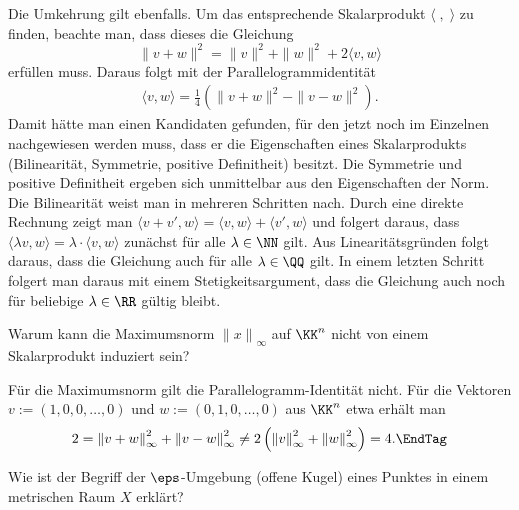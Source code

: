 \begin{antwort}
  Die Umkehrung gilt ebenfalls. 
  Um das entsprechende Skalarprodukt 
  $\langle \;, \; \rangle$ zu finden, beachte man, 
  dass dieses die Gleichung 
  \[
  \| v+ w \|^2 = \| v \|^2 + \|w \|^2 + 2\langle v,w \rangle 
  \]
  erfüllen muss. Daraus folgt mit der Parallelogrammidentität
  \begin{eqnarray*}
    \langle v, w \rangle = \frac{1}{4} 
    \left( \| v+w \|^2 - \| v-w \|^2 \right).
  \end{eqnarray*}
  Damit hätte man einen Kandidaten gefunden, für den jetzt 
  noch im Einzelnen nachgewiesen werden muss, dass er die Eigenschaften 
  eines Skalarprodukts (Bilinearität, Symmetrie, positive Definitheit) 
  besitzt. Die Symmetrie und positive Definitheit ergeben sich unmittelbar 
  aus den Eigenschaften der Norm. 
  Die Bilinearität weist man in mehreren Schritten nach. 
  Durch eine direkte Rechnung zeigt man 
  $\langle v+v', w \rangle = \langle v, w \rangle + \langle v', w \rangle$ und 
  folgert daraus, dass  $\langle \lambda v, w \rangle 
  = \lambda\cdot \langle v, w \rangle$ zunächst für alle 
  $\lambda \in \NN$ gilt. Aus Linearitätsgründen folgt daraus, dass die  
  Gleichung auch für alle $\lambda\in\QQ$ gilt. 
  In einem letzten Schritt folgert man daraus mit einem 
  Stetigkeitsargument, dass die Gleichung auch noch für 
  beliebige $\lambda\in \RR$ 
  gültig bleibt.\AntEnd 
\end{antwort}

\begin{frage}
  Warum kann die Maximumsnorm ${\| x \|}_\infty$ auf $\KK^n$ nicht von 
  einem Skalarprodukt induziert sein?
\end{frage}

\begin{antwort}
  Für die Maximumsnorm gilt die Parallelogramm-Identität nicht. 
  Für die Vektoren $v:=(1,0,0,\ldots,0)$ und $w:=(0,1,0,\ldots,0)$ 
  aus $\KK^n$ etwa erhält man 
  \begin{equation}
    2 = {\| v+w \|}_\infty^2 + {\| v-w \|}_\infty^2 \not= 
    2 \left( {\| v \|}^2_\infty + {\| w\|}^2_\infty \right)= 4.
    \EndTag
  \end{equation}
\end{antwort}

\begin{frage}
  Wie ist der Begriff der $\eps$-Umgebung (offene Kugel) 
  eines Punktes in einem metrischen Raum $X$ erklärt?
\end{frage}


